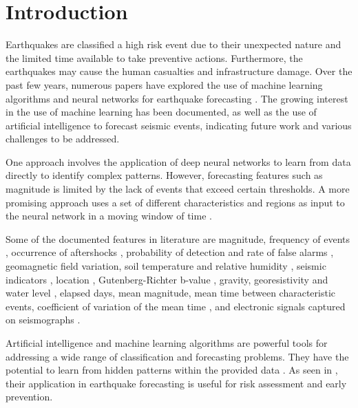 \documentclass[sn-mathphys-num]{sn-jnl}
\begin{document}
\section{Introduction}\label{introduction}

Earthquakes are classified a high risk event due to their unexpected nature and the limited time available to take preventive actions. Furthermore, the earthquakes may cause the human casualties and infrastructure damage. Over the past few years, numerous papers have explored the use of machine learning algorithms and neural networks for earthquake forecasting \cite{banna_application_2020, florido_earthquake_2016, mignan_neural_2020, jiao_artificial_2020, galkina_machine_nodate, kong_machine_2019}. The growing interest in the use of machine learning has been documented, as well as the use of artificial intelligence to forecast seismic events, indicating future work and various challenges to be addressed.

One approach involves the application of deep neural networks to learn from data directly to identify complex patterns. However, forecasting features such as magnitude is limited by the lack of events that exceed certain thresholds. A more promising approach uses a set of different characteristics and regions as input to the neural network in a moving window of time \cite{wang_earthquake_2020}.

Some of the documented features in literature are magnitude, frequency of events \cite{han_medium-_1997,de_falco_seismicity_2000,bodri_neural-network_2001,wang_support_2006,sri_lakshmi_model_2009}, occurrence of aftershocks \cite{lin_forecast_2002}, probability of detection and rate of false alarms \cite{panakkat_neural_2007} , geomagnetic field variation, soil temperature and relative humidity \cite{suratgar_magnitude_2008}, seismic indicators \cite{panakkat_recurrent_2009}, location \cite{veri_earthquake_2012}, Gutenberg-Richter b-value \cite{morales-esteban_earthquake_2013,reyes_neural_2013,asenciocortes_earthquake_2018}, gravity, georesistivity and water level \cite{cai_anomaly_2019}, elapsed days, mean magnitude, mean time between characteristic events, coefficient of variation of the mean time \cite{banna_attention-based_2021}, and electronic signals captured on seismographs \cite{bose_preseis_2008,lakkos_neural_1994,rovithakis_neural_2000,ifantis_support_2003,radeva_real-time_2005,bernardo-torres_one-step_2009}.

Artificial intelligence and machine learning algorithms are powerful tools for addressing a wide range of classification and forecasting problems. They have the potential to learn from hidden patterns within the provided data \cite{kong_machine_2019}. As seen in \cite{kong_machine_2019, bose_preseis_2008}, their application in earthquake forecasting is useful for risk assessment and early prevention. 
\end{document}
